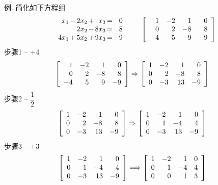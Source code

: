 例. 简化如下方程组
\[\begin{array}{r@{\hspace{1.5pt}}l@{\hspace{1.5pt}}r@{\hspace{1.5pt}}l@{\hspace{1.5pt}}r@{\hspace{1.5pt}}l@{\hspace{1.5pt}}r}
x_1 & - & 2x_2 & + &  x_3 & = & 0\\
	& 	& 2x_2 & - & 8x_3 & = & 8\\
-4x_1 & + & 5x_2 & + & 9x_3 & = & -9
\end{array}\qquad\left[\begin{array}{r r r r}
	1 & -2 & 1 & 0\\
	0 & 2 & -8 & 8\\
	-4 & 5 & 9 & -9
\end{array}\right]\]
步骤1 -- +4
\[\left[\begin{array}{r r r r}
    1 & -2 & 1 & 0\\
    0 & 2 & -8 & 8\\
    -4 & 5 & 9 & -9
\end{array}\right] \Rightarrow \left[\begin{array}{r r r r}
    1 & -2 & 1 & 0\\
    0 & 2 & -8 & 8\\
    0 & -3 & 13 & -9
\end{array}\right]\]
步骤2 -- $\dfrac{1}{2}$
\[\left[\begin{array}{r r r r}
    1 & -2 & 1 & 0\\
    0 & 2 & -8 & 8\\
    0 & -3 & 13 & -9
\end{array}\right] \Rightarrow \left[\begin{array}{r r r r}
    1 & -2 & 1 & 0\\
    0 & 1 & -4 & 4\\
    0 & -3 & 13 & -9
\end{array}\right]\]
步骤3 -- +3
\[\left[\begin{array}{r r r r}
    1 & -2 & 1 & 0\\
    0 & 1 & -4 & 4\\
    0 & -3 & 13 & -9
\end{array}\right] \Longrightarrow \left[\begin{array}{r r r r}
	1 & -2 & 1 & 0\\
	0 & 1 & -4 & 4\\
	0 & 0 & 1 & 3
\end{array}\right]\]
